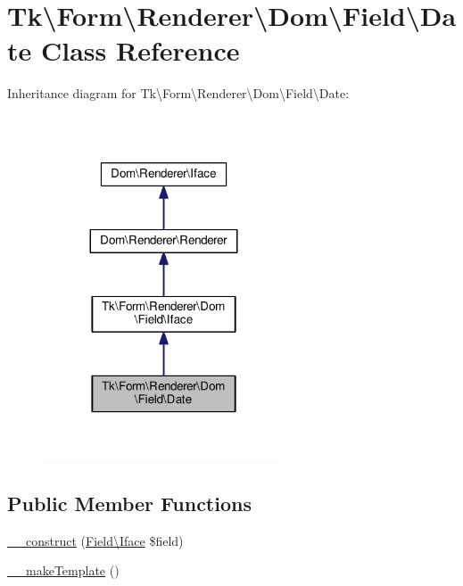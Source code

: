 \hypertarget{classTk_1_1Form_1_1Renderer_1_1Dom_1_1Field_1_1Date}{\section{Tk\textbackslash{}Form\textbackslash{}Renderer\textbackslash{}Dom\textbackslash{}Field\textbackslash{}Date Class Reference}
\label{classTk_1_1Form_1_1Renderer_1_1Dom_1_1Field_1_1Date}
}


Inheritance diagram for Tk\textbackslash{}Form\textbackslash{}Renderer\textbackslash{}Dom\textbackslash{}Field\textbackslash{}Date\+:\nopagebreak
\begin{figure}[H]
\begin{center}
\leavevmode
\includegraphics[width=203pt]{classTk_1_1Form_1_1Renderer_1_1Dom_1_1Field_1_1Date__inherit__graph}
\end{center}
\end{figure}
\subsection*{Public Member Functions}
\begin{DoxyCompactItemize}
\item 
\hyperlink{classTk_1_1Form_1_1Renderer_1_1Dom_1_1Field_1_1Date_aaa7073d65826e175d30157cafafe9b66}{\+\_\+\+\_\+construct} (\hyperlink{classTk_1_1Form_1_1Renderer_1_1Dom_1_1Field_1_1Iface}{Field\textbackslash{}\+Iface} \$field)
\item 
\hyperlink{classTk_1_1Form_1_1Renderer_1_1Dom_1_1Field_1_1Date_a5ce4951aefa90b53837ce13c9c911380}{\+\_\+\+\_\+make\+Template} ()
\end{DoxyCompactItemize}

